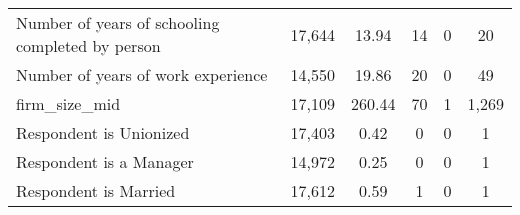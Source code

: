 {\begin{tabular}{l*{1}{ccccc}}
Number of years of schooling completed by person&      17,644&       13.94&          14&           0&          20\\
Number of years of work experience&      14,550&       19.86&          20&           0&          49\\
firm\_size\_mid       &      17,109&      260.44&          70&           1&       1,269\\
Respondent is Unionized&      17,403&        0.42&           0&           0&           1\\
Respondent is a Manager&      14,972&        0.25&           0&           0&           1\\
Respondent is Married&      17,612&        0.59&           1&           0&           1\\
\bottomrule
\end{tabular}
}
